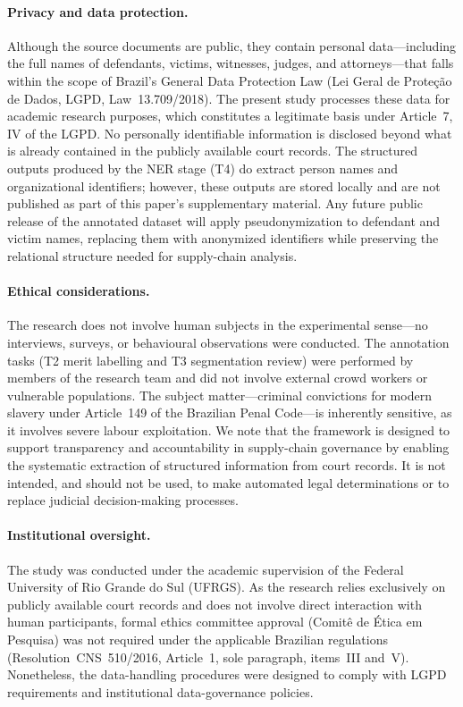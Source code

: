\documentclass[preprint,a4paper,fleqn]{cas-dc}
\begin{document}
\paragraph{Privacy and data protection.}
Although the source documents are public, they contain personal data---including the full names of defendants, victims, witnesses, judges, and attorneys---that falls within the scope of Brazil's General Data Protection Law (Lei Geral de Prote\c{c}\~ao de Dados, LGPD, Law~13.709/2018). The present study processes these data for academic research purposes, which constitutes a legitimate basis under Article~7, IV of the LGPD. No personally identifiable information is disclosed beyond what is already contained in the publicly available court records. The structured outputs produced by the NER stage (T4) do extract person names and organizational identifiers; however, these outputs are stored locally and are not published as part of this paper's supplementary material. Any future public release of the annotated dataset will apply pseudonymization to defendant and victim names, replacing them with anonymized identifiers while preserving the relational structure needed for supply-chain analysis.

\paragraph{Ethical considerations.}
The research does not involve human subjects in the experimental sense---no interviews, surveys, or behavioural observations were conducted. The annotation tasks (T2 merit labelling and T3 segmentation review) were performed by members of the research team and did not involve external crowd workers or vulnerable populations. The subject matter---criminal convictions for modern slavery under Article~149 of the Brazilian Penal Code---is inherently sensitive, as it involves severe labour exploitation. We note that the framework is designed to support transparency and accountability in supply-chain governance by enabling the systematic extraction of structured information from court records. It is not intended, and should not be used, to make automated legal determinations or to replace judicial decision-making processes.

\paragraph{Institutional oversight.}
The study was conducted under the academic supervision of the Federal University of Rio Grande do Sul (UFRGS). As the research relies exclusively on publicly available court records and does not involve direct interaction with human participants, formal ethics committee approval (Comit\^e de \'Etica em Pesquisa) was not required under the applicable Brazilian regulations (Resolution~CNS~510/2016, Article~1, sole paragraph, items~III and~V). Nonetheless, the data-handling procedures were designed to comply with LGPD requirements and institutional data-governance policies.
\end{document}
